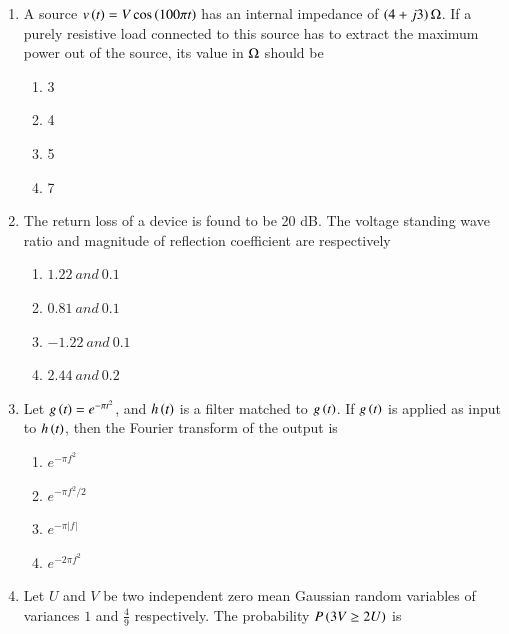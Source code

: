 \documentclass[journal,12pt,onecolumn]{IEEEtran}
\theoremstyle{remark}
\begin{document}
\begin{enumerate}
\item A source $v\left(t\right) = V \cos\left(100\pi t\right)$ has an internal impedance of $(4 + j3)\,\ohm$. If a purely resistive load connected to this source has to extract the maximum power out of the source, its value in $\ohm$ should be
\begin{multicols}{4}
\begin{enumerate}
\item 3
\item 4
\item 5
\item 7
\end{enumerate}
\end{multicols}
\hfill {}

\item The return loss of a device is found to be 20 dB. The voltage standing wave ratio  and magnitude of reflection coefficient are respectively
\begin{multicols}{4}
\begin{enumerate}
    \item $1.22 \ and \ 0.1$
    \item $0.81 \ and \  0.1$
    \item $-1.22 \ and  \ 0.1$
    \item $2.44 \ and \ 0.2$
\end{enumerate}
\end{multicols}
\hfill {}

\item Let $g\left(t\right) = e^{-\pi t^2}$, and $h\left(t\right)$ is a filter matched to $g\left(t\right)$. If $g\left(t\right)$ is applied as input to $h\left(t\right)$, then the Fourier transform of the output is

\begin{multicols}{4}
\begin{enumerate}
\item $e^{-\pi f^2}$
\item $e^{-\pi f^2/2}$
\item $e^{-\pi |f|}$
\item $e^{-2\pi f^2}$
\end{enumerate}
\end{multicols}
\hfill {}

\item Let $U$ and $V$ be two independent zero mean Gaussian random variables of variances $1$ and $\frac{4}{9}$ respectively. The probability $P\left(3V \geq 2U\right)$ is


\end{enumerate}
\end{document}
